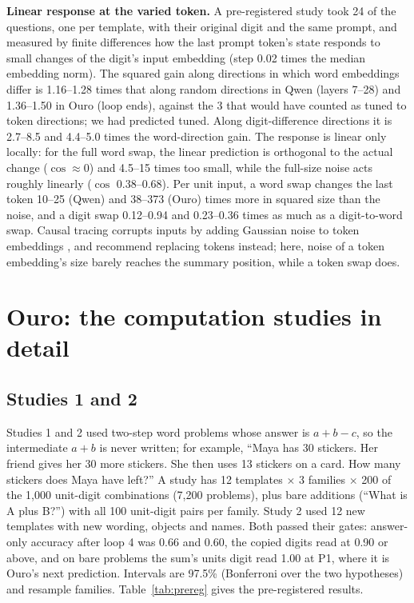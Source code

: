 \documentclass{article}
\begin{document}
\textbf{Linear response at the varied token.} A pre-registered study took 24 of the questions, one per template, with their original digit and the same prompt, and measured by finite differences how the last prompt token's state responds to small changes of the digit's input embedding (step 0.02 times the median embedding norm). The squared gain along directions in which word embeddings differ is 1.16--1.28 times that along random directions in Qwen (layers 7--28) and 1.36--1.50 in Ouro (loop ends), against the 3 that would have counted as tuned to token directions; we had predicted tuned. Along digit-difference directions it is 2.7--8.5 and 4.4--5.0 times the word-direction gain. The response is linear only locally: for the full word swap, the linear prediction is orthogonal to the actual change ($\cos \approx 0$) and 4.5--15 times too small, while the full-size noise acts roughly linearly ($\cos$ 0.38--0.68). Per unit input, a word swap changes the last token 10--25 (Qwen) and 38--373 (Ouro) times more in squared size than the noise, and a digit swap 0.12--0.94 and 0.23--0.36 times as much as a digit-to-word swap. Causal tracing corrupts inputs by adding Gaussian noise to token embeddings \citep{meng2022locating}, and \citet{zhang2024patching} recommend replacing tokens instead; here, noise of a token embedding's size barely reaches the summary position, while a token swap does.

\section{Ouro: the computation studies in detail}\label{app:ouro}

\subsection{Studies 1 and 2}\label{sec:studies}

Studies 1 and 2 used two-step word problems whose answer is $a+b-c$, so the intermediate $a+b$ is never written; for example, ``Maya has 30 stickers. Her friend gives her 30 more stickers. She then uses 13 stickers on a card. How many stickers does Maya have left?'' A study has 12 templates $\times$ 3 families $\times$ 200 of the 1,000 unit-digit combinations (7,200 problems), plus bare additions (``What is A plus B?'') with all 100 unit-digit pairs per family. Study 2 used 12 new templates with new wording, objects and names. Both passed their gates: answer-only accuracy after loop 4 was 0.66 and 0.60, the copied digits read at 0.90 or above, and on bare problems the sum's units digit read 1.00 at P1, where it is Ouro's next prediction. Intervals are 97.5\% (Bonferroni over the two hypotheses) and resample families. Table~\ref{tab:prereg} gives the pre-registered results.
\end{document}
